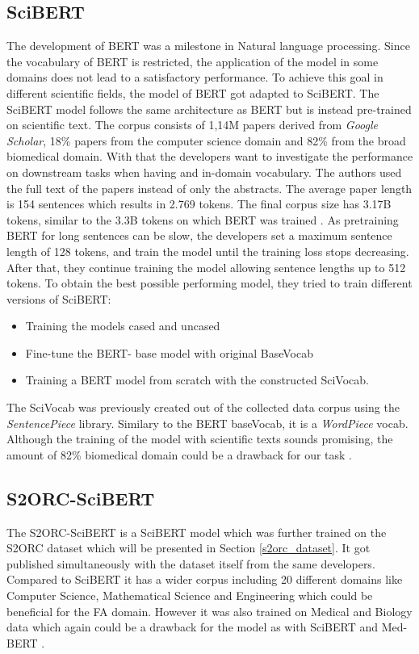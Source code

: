 \subsection{SciBERT}
The development of BERT was a milestone in Natural language processing. Since the vocabulary of BERT is restricted, the application of the model in some domains does not lead to a satisfactory performance. To achieve this goal in different scientific fields, the model of BERT got adapted to SciBERT. The SciBERT model follows the same architecture as BERT but is instead pre-trained on scientific text. The corpus consists of 1,14M papers derived from \textit{Google Scholar}, 18\% papers from the computer science domain and 82\% from the broad biomedical domain. With that the developers want to investigate the performance on downstream tasks when having and in-domain vocabulary. The authors used the full text of the papers instead of only the abstracts. The average paper length is 154 sentences which results in 2.769 tokens. The final corpus size has 3.17B tokens, similar to the 3.3B tokens on which BERT was trained \cite{Beltagy}. \newline
As pretraining BERT for long sentences can be slow, the developers set a maximum sentence length of 128 tokens, and train the model until the training loss stops decreasing. After that, they continue training the model allowing sentence lengths up to 512 tokens. To obtain the best possible performing model, they tried to train different versions of SciBERT:

\begin{itemize}
	\item Training the models cased and uncased
	\item Fine-tune the BERT- base model with original BaseVocab
	\item Training a BERT model from scratch with the constructed SciVocab.
\end{itemize}

The SciVocab was previously created out of the collected data corpus using the \textit{SentencePiece} library. Similary to the BERT baseVocab, it is a \textit{WordPiece} vocab. \newline
Although the training of the model with scientific texts sounds promising, the amount of 82\% biomedical domain could be a drawback for our task \cite{Beltagy}.

\subsection{S2ORC-SciBERT}
The S2ORC-SciBERT is a SciBERT model which was further trained on the S2ORC dataset which will be presented in Section \ref{s2orc_dataset}. It got published simultaneously with the dataset itself from the same developers. Compared to SciBERT it has a wider corpus including 20 different domains like Computer Science, Mathematical Science and Engineering which could be beneficial for the FA domain. However it was also trained on Medical and Biology data which again could be a drawback for the model as with SciBERT and Med-BERT \cite{Lo}.

